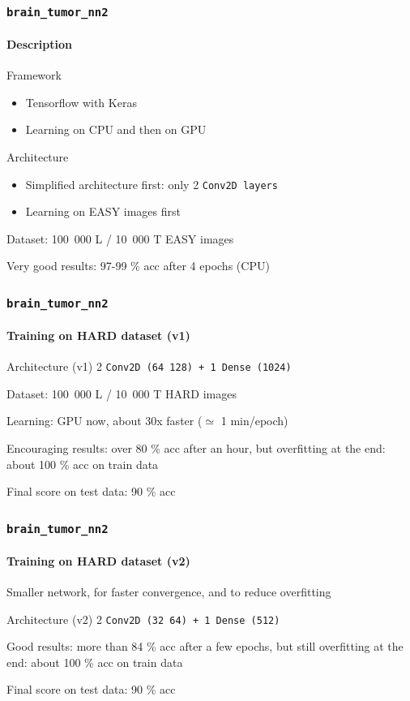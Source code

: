 \documentclass[]{beamer}
\newcommand{\btnt}{\tt{brain\_tumor\_nn2}}
\begin{document}
\begin{frame}
  \frametitle{\btnt}
  \framesubtitle{Description}

  \begin{block}{Framework}
    \begin{itemize}
      \item Tensorflow with Keras
      \item Learning on CPU and then on GPU
    \end{itemize}
  \end{block}

  \begin{exampleblock}{Architecture}
    \begin{itemize}
      \item Simplified architecture first: only 2 \tt{Conv2D} layers
      \item Learning on \alert{EASY} images first
    \end{itemize}
  \end{exampleblock}

  Dataset: 100~000 L / 10~000 T \alert{EASY} images

  Very good results: \alert{97-99 \% acc} after 4 epochs (CPU)
\end{frame}

\begin{frame}
  \frametitle{\btnt}
  \framesubtitle{Training on HARD dataset (v1)}

  \begin{exampleblock}{Architecture (v1)}
    2 \tt{Conv2D} (64 128) + 1 \tt{Dense} (1024)
  \end{exampleblock}

  Dataset: 100~000 L / 10~000 T \alert{HARD} images

  Learning: \alert{GPU} now, about 30x faster ($\simeq$ 1 min/epoch)

  Encouraging results: over \alert{80 \% acc} after an hour, but \alert{overfitting} at the end: about \alert{100 \% acc} on train data

  \medskip

  Final score on test data: \alert{90 \% acc}
\end{frame}

\begin{frame}
  \frametitle{\btnt}
  \framesubtitle{Training on HARD dataset (v2)}

  Smaller network, for faster convergence, and to reduce overfitting

  \begin{exampleblock}{Architecture (v2)}
    2 \tt{Conv2D} (32 64) + 1 \tt{Dense} (512)
  \end{exampleblock}

  Good results: more than \alert{84 \% acc} after a few epochs, but still \alert{overfitting} at the end: about \alert{100 \% acc} on train data

  \medskip

  Final score on test data: \alert{90 \% acc}
\end{frame}
\end{document}
